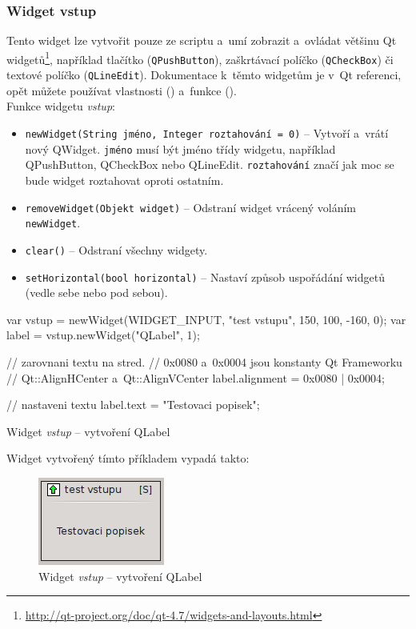 \documentclass[12pt, a4paper, oneside]{article}
\newcommand{\It}{\textit}  %
\begin{document}
\subsubsection*{Widget vstup}
Tento widget lze vytvořit pouze ze scriptu a~umí zobrazit a~ovládat většinu Qt widgetů\footnote{\url{http://qt-project.org/doc/qt-4.7/widgets-and-layouts.html}}, například tlačítko (\verb/QPushButton/), zaškrtávací políčko (\verb/QCheckBox/) či textové políčko (\verb/QLineEdit/). Dokumentace k~těmto widgetům je v~Qt referenci, opět můžete používat vlastnosti () a~funkce ().\\
Funkce widgetu \It{vstup}:
\begin{itemize}
    \item {\color{blue}\verb/newWidget(String jméno, Integer roztahování = 0)/} -- Vytvoří a~vrátí nový QWidget. \verb/jméno/ musí být jméno třídy widgetu, například QPushButton, QCheckBox nebo QLineEdit. \verb/roztahování/ značí jak moc se bude widget roztahovat oproti ostatním.
    \item {\color{blue}\verb/removeWidget(Objekt widget)/} -- Odstraní widget vrácený voláním \verb|newWidget|.
    \item {\color{blue}\verb/clear()/} -- Odstraní všechny widgety.
    \item {\color{blue}\verb/setHorizontal(bool horizontal)/} -- Nastaví způsob uspořádání widgetů (vedle sebe nebo pod sebou).
\end{itemize}

\begin{listing}[H]
\begin{jscode}
var vstup = newWidget(WIDGET_INPUT,
                "test vstupu", 150, 100, -160, 0);
var label = vstup.newWidget("QLabel", 1);

// zarovnani textu na stred. 
// 0x0080 a~0x0004 jsou konstanty Qt Frameworku 
// Qt::AlignHCenter a~Qt::AlignVCenter
label.alignment = 0x0080 | 0x0004;

// nastaveni textu
label.text = "Testovaci popisek";
\end{jscode}
\caption{Widget \It{vstup} -- vytvoření QLabel}
\end{listing}
Widget vytvořený tímto příkladem vypadá takto:

\begin{figure}[H]
\begin{center}
\includegraphics{img/ref_input.png}
\caption{Widget \It{vstup} -- vytvoření QLabel}
\end{center}
\end{figure}
\end{document}

